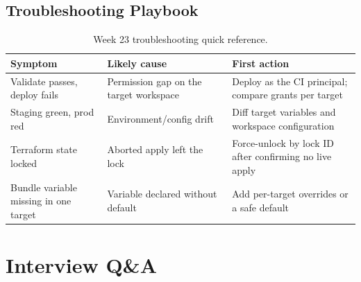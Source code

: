 \subsection{Troubleshooting Playbook}
\begin{table}[H]
\centering
\small
\begin{tabular}{@{}p{3.6cm}p{4.2cm}p{4.8cm}@{}}
\toprule
\textbf{Symptom} & \textbf{Likely cause} & \textbf{First action} \\
\midrule
Validate passes, deploy fails & Permission gap on the target workspace & Deploy as the CI principal; compare grants per target \\
Staging green, prod red & Environment/config drift & Diff target variables and workspace configuration \\
Terraform state locked & Aborted apply left the lock & Force-unlock by lock ID after confirming no live apply \\
Bundle variable missing in one target & Variable declared without default & Add per-target overrides or a safe default \\
\bottomrule
\end{tabular}
\caption{Week 23 troubleshooting quick reference.}
\label{tab:ch23-trouble}
\end{table}

\section{Interview Q\&A}
